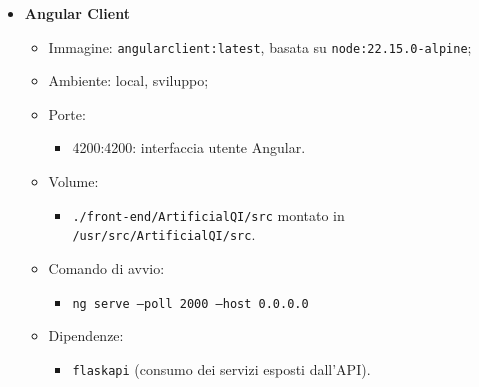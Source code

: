 \begin{itemize}
  \item \textbf{Angular Client}
  \begin{itemize}
    \item Immagine: \texttt{angularclient:latest}, basata su \texttt{node:22.15.0-alpine};
    \item Ambiente: local, sviluppo;
    \item Porte:
    \begin{itemize}
      \item 4200:4200: interfaccia utente Angular.
    \end{itemize}
    \item Volume:
    \begin{itemize}
      \item \texttt{./front-end/ArtificialQI/src} montato in \texttt{/usr/src/ArtificialQI/src}.
    \end{itemize}
    \item Comando di avvio:
    \begin{itemize}
      \item \texttt{ng serve --poll 2000 --host 0.0.0.0}
    \end{itemize}
    \item Dipendenze:
    \begin{itemize}
      \item \texttt{flaskapi} (consumo dei servizi esposti dall’API).
    \end{itemize}
  \end{itemize}
\end{itemize}

